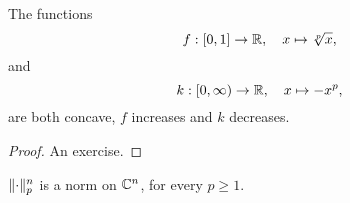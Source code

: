 \begin{lemma}\label{lemma:two-concave-functions}
  The functions
  \begin{equation}\label{eq:f-function}
    f:[0,1]\to\mathbb{R},\quad{x\mapsto{\sqrt[p]{x}}},
  \end{equation}
  and
  \begin{equation}\label{eq:k-function}
    k:[0,\infty)\to\mathbb{R},\quad{x\mapsto{-x^{p}}},
  \end{equation}
  are both concave, \(f\) increases and \(k\) decreases.
\end{lemma}

\begin{proof}
  An exercise.
\end{proof}

\begin{proposition}\label{proposition:the-p-norm-is-in-fact-a-norm}
  \(\norm<n>[p]\) is a norm on \(\mathbb{C}^{n}\), for every
  \(p\geqslant{1}\).
\end{proposition}


